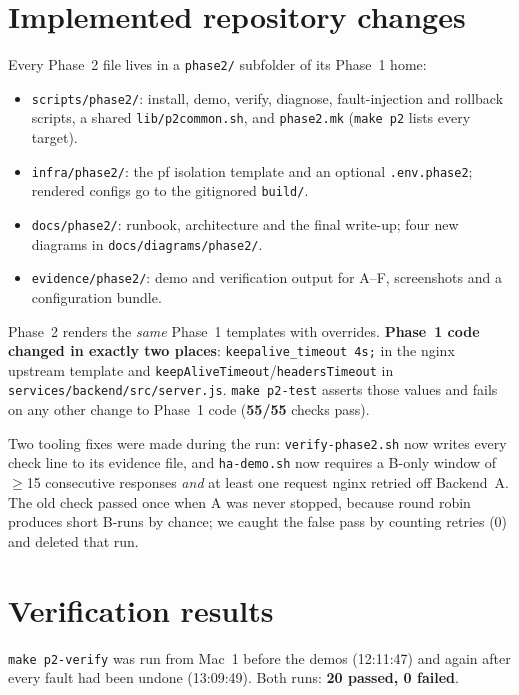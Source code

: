 \documentclass[11pt,a4paper]{article}
\begin{document}
\section{Implemented repository changes}
Every Phase~2 file lives in a \texttt{phase2/} subfolder of its Phase~1 home:
\begin{itemize}
  \item \texttt{scripts/phase2/}: install, demo, verify, diagnose, fault-injection and rollback scripts, a shared \texttt{lib/p2common.sh}, and \texttt{phase2.mk} (\texttt{make p2} lists every target).
  \item \texttt{infra/phase2/}: the pf isolation template and an optional \texttt{.env.phase2}; rendered configs go to the gitignored \texttt{build/}.
  \item \texttt{docs/phase2/}: runbook, architecture and the final write-up; four new diagrams in \texttt{docs/diagrams/phase2/}.
  \item \texttt{evidence/phase2/}: demo and verification output for A--F, screenshots and a configuration bundle.
\end{itemize}
Phase~2 renders the \emph{same} Phase~1 templates with overrides. \textbf{Phase~1 code changed in
exactly two places}: \texttt{keepalive\_timeout 4s;} in the nginx upstream template and
\texttt{keepAliveTimeout}/\texttt{headersTimeout} in \texttt{services/backend/src/server.js}.
\texttt{make p2-test} asserts those values and fails on any other change to Phase~1 code
(\textbf{55/55} checks pass).

Two tooling fixes were made during the run: \texttt{verify-phase2.sh} now writes every check line
to its evidence file, and \texttt{ha-demo.sh} now requires a B-only window of $\geq$15 consecutive
responses \emph{and} at least one request nginx retried off Backend~A. The old check passed once
when A was never stopped, because round robin produces short B-runs by chance; we caught the false
pass by counting retries (0) and deleted that run.

\section{Verification results}
\texttt{make p2-verify} was run from Mac~1 before the demos (12:11:47) and again after every fault
had been undone (13:09:49). Both runs: \textbf{20 passed, 0 failed}.
\end{document}
